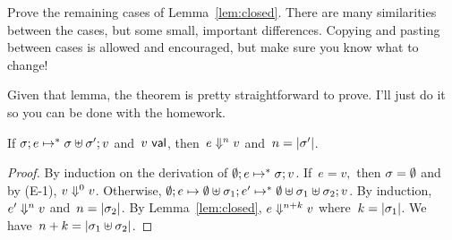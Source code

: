\documentclass{article}
\begin{document}
\begin{task}
  Prove the remaining cases of Lemma~\ref{lem:closed}.
  There are many similarities between the cases, but some small, important
  differences. Copying and pasting between cases is allowed and encouraged,
  but make sure you know what to change!
\end{task}

Given that lemma, the theorem is pretty straightforward to prove.
%
I'll just do it so you can be done with the homework.

\begin{thm}
  If $\cfg{\store}{e} \step^* \cfg{\stjoin{\store}{\store'}}{v}$ and~$v \val$,
  then~$\eval[n]{e}{v}$ and~$n = |\store'|$.
\end{thm}
\begin{proof}
  By induction on the derivation of $\cfg{\estore}{e} \step^* \cfg{\store}{v}$.
  If~$e = v,$ then $\store = \estore$ and by (E-1), $\eval[0]{v}{v}$. 
  Otherwise,
  $\cfg{\estore}{e} \step \cfg{\stjoin{\estore}{\store_1}}{e'}
  \step^* \cfg{\stjoin{\estore}{\stjoin{\store_1}{\store_2}}}{v}$.
  By induction,~$\eval[n]{e'}{v}$
  and~$n = |\store_2|$.
  By Lemma~\ref{lem:closed}, $\eval[n + k]{e}{v}$
  where~$k = |\store_1|$.
  We have~$n + k = |\stjoin{\store_1}{\store_2}|$.
\end{proof}
\end{document}
